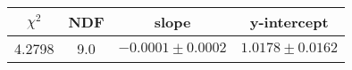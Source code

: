 \begin{tabular}{|c|c|c|c|}

\hline
$\chi^{2}$ & NDF & slope & y-intercept  \\
\hline
4.2798 & 9.0 & $-0.0001\pm0.0002$ & $1.0178\pm0.0162$ \\
\hline

\end{tabular}